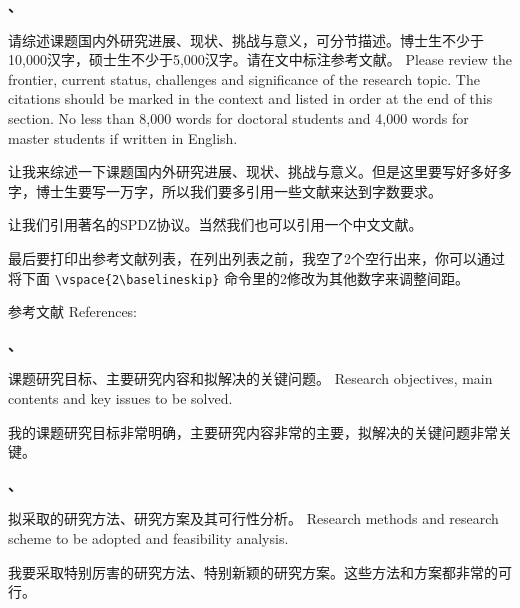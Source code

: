 \documentclass[zihao=-4,a4paper,fontset=fandol]{ctexart}
\newcounter{field}
\newenvironment{field}
    {\vspace{12pt}\bfseries\noindent\stepcounter{field}\thefield 、\begin{minipage}[t]{\linewidth-24pt}}
    {\end{minipage}\vspace{12pt}}
\newenvironment{content}{\kaishu}{}
\begin{document}

\begin{field}
    请综述课题国内外研究进展、现状、挑战与意义，可分节描述。博士生不少于10,000汉字，硕士生不少于5,000汉字。请在文中标注参考文献。 
    Please review the frontier, current status, challenges and significance of the research topic. The citations should be marked in the context and listed in order at the end of this section. No less than 8,000 words for doctoral students and 4,000 words for master students if written in English.
\end{field}

\begin{content}
    让我来综述一下课题国内外研究进展、现状、挑战与意义。但是这里要写好多好多字，博士生要写一万字，所以我们要多引用一些文献来达到字数要求。

    让我们引用著名的SPDZ协议\cite{SPDZ}。当然我们也可以引用一个中文文献\cite{ZJSD}。

    最后要打印出参考文献列表，在列出列表之前，我空了2个空行出来，你可以通过将下面 \verb|\vspace{2\baselineskip}| 命令里的2修改为其他数字来调整间距。

    \vspace{2\baselineskip}
    参考文献 References: 
    \printbibliography[heading=none]
\end{content}


\begin{field}
    课题研究目标、主要研究内容和拟解决的关键问题。 
    Research objectives, main contents and key issues to be solved.
\end{field}

\begin{content}
    我的课题研究目标非常明确，主要研究内容非常的主要，拟解决的关键问题非常关键。
\end{content}


\begin{field}
    拟采取的研究方法、研究方案及其可行性分析。
    Research methods and research scheme to be adopted and feasibility analysis.
\end{field}

\begin{content}
    我要采取特别厉害的研究方法、特别新颖的研究方案。这些方法和方案都非常的可行。
\end{content}
\end{document}

